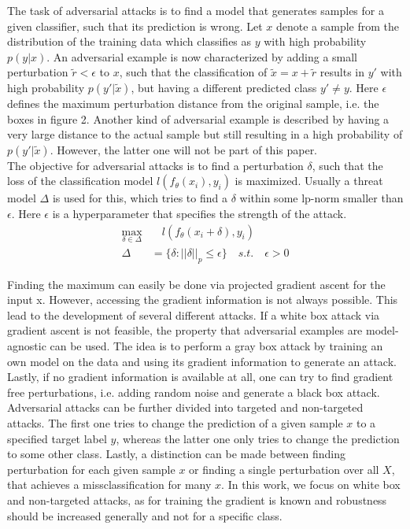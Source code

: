 \documentclass[conference]{IEEEtran}
\begin{document}
The task of adversarial attacks is to find a model that generates samples for a given classifier, such that its prediction is wrong. Let $x$ denote a sample from the distribution of the training data which classifies as $y$ with high probability $p(y|x)$. An adversarial example is now characterized by adding a small perturbation $\tilde{r} < \epsilon$ to $x$, such that the classification of $\tilde{x} = x + \tilde{r}$ results in $y'$ with high probability $p(y'|\tilde{x})$, but having a different predicted class $y' \neq y$. Here $\epsilon$ defines the maximum perturbation distance from the original sample, i.e. the boxes in figure 2. Another kind of adversarial example is described by having a very large distance to the actual sample but still resulting in a high probability of $p(y'|\tilde{x})$. However, the latter one will not be part of this paper. \\
The objective for adversarial attacks is to find a perturbation $\delta$, such that the loss of the classification model $l(f_{\theta}(x_i), y_i)$ is maximized. Usually a threat model $\Delta$ is used for this, which tries to find a $\delta$ within some lp-norm smaller than $\epsilon$. Here $\epsilon$ is a hyperparameter that specifies the strength of the attack. 
\begin{align*}
  \max_{\delta \in \Delta} & \quad l(f_{\theta}(x_i + \delta), y_i)  \\
\Delta &= \{\delta : ||\delta||_p \leq \epsilon\} \quad s.t. \quad \epsilon > 0
\end{align*}

Finding the maximum can easily be done via projected gradient ascent for the input x. However, accessing the gradient information is not always possible. This lead to the development of several different attacks. If a white box attack via gradient ascent is not feasible, the property that adversarial examples are model-agnostic can be used. The idea is to perform a gray box attack by training an own model on the data and using its gradient information to generate an attack. Lastly, if no gradient information is available at all, one can try to find gradient free perturbations, i.e. adding random noise and generate a black box attack. \\
Adversarial attacks can be further divided into targeted and non-targeted attacks. The first one tries to change the prediction of a given sample $x$ to a specified target label $y$, whereas the latter one only tries to change the prediction to some other class. Lastly, a distinction can be made between finding perturbation for each given sample $x$ or finding a single perturbation over all $X$, that achieves a missclassification for many $x$. In this work, we focus on white box and non-targeted attacks, as for training the gradient is known and robustness should be increased generally and not for a specific class. 
\end{document}
